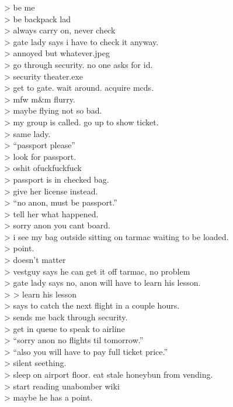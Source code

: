 \textgreater{} be me \\
\textgreater{} be backpack lad \\
\textgreater{} always carry on, never check \\
\textgreater{} gate lady says i have to check it anyway.  \\
\textgreater{} annoyed but whatever.jpeg \\
\textgreater{} go through security. no one asks for id.  \\
\textgreater{} security theater.exe \\
\textgreater{} get to gate. wait around. acquire mcds. \\
\textgreater{} mfw m\&m flurry. \\
\textgreater{} maybe flying not so bad. \\
\textgreater{} my group is called. go up to show ticket. \\
\textgreater{} same lady. \\
\textgreater{} ``passport please'' \\
\textgreater{} look for passport.  \\
\textgreater{} oshit ofuckfuckfuck \\
\textgreater{} passport is in checked bag. \\
\textgreater{} give her license instead. \\
\textgreater{} ``no anon, must be passport.'' \\
\textgreater{} tell her what happened. \\
\textgreater{} sorry anon you cant board.  \\
\textgreater{} i see my bag outside sitting on tarmac waiting to be loaded. \\
\textgreater{} point. \\
\textgreater{} doesn't matter \\
\textgreater{} vestguy says he can get it off tarmac, no problem \\
\textgreater{} gate lady says no, anon will have to learn his lesson. \\
\textgreater{} \textgreater{} learn his lesson \\
\textgreater{} says to catch the next flight in a couple hours. \\
\textgreater{} sends me back through security.   \\
\textgreater{} get in queue to speak to airline \\
\textgreater{} ``sorry anon no flights til tomorrow.'' \\
\textgreater{} ``also you will have to pay full ticket price.'' \\
\textgreater{} silent seething. \\
\textgreater{} sleep on airport floor. eat stale honeybun from vending.  \\
\textgreater{} start reading unabomber wiki \\
\textgreater{} maybe he has a point.